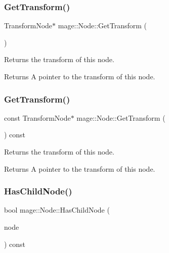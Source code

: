 \subsubsection{\texorpdfstring{Get\+Transform()}{GetTransform()}\hspace{0.1cm}{\footnotesize\ttfamily [1/2]}}
{\footnotesize\ttfamily Transform\+Node$\ast$ mage\+::\+Node\+::\+Get\+Transform (\begin{DoxyParamCaption}{ }\end{DoxyParamCaption})\hspace{0.3cm}{\ttfamily [noexcept]}}

Returns the transform of this node.

\begin{DoxyReturn}{Returns}
A pointer to the transform of this node. 
\end{DoxyReturn}
\hypertarget{classmage_1_1_node_acbffccfec34313d8583546204c3d9fda}{}\label{classmage_1_1_node_acbffccfec34313d8583546204c3d9fda} 
\subsubsection{\texorpdfstring{Get\+Transform()}{GetTransform()}\hspace{0.1cm}{\footnotesize\ttfamily [2/2]}}
{\footnotesize\ttfamily const Transform\+Node$\ast$ mage\+::\+Node\+::\+Get\+Transform (\begin{DoxyParamCaption}{ }\end{DoxyParamCaption}) const\hspace{0.3cm}{\ttfamily [noexcept]}}

Returns the transform of this node.

\begin{DoxyReturn}{Returns}
A pointer to the transform of this node. 
\end{DoxyReturn}
\hypertarget{classmage_1_1_node_a1b8c2d933a281f7f815791db38c965ad}{}\label{classmage_1_1_node_a1b8c2d933a281f7f815791db38c965ad} 
\subsubsection{\texorpdfstring{Has\+Child\+Node()}{HasChildNode()}}
{\footnotesize\ttfamily bool mage\+::\+Node\+::\+Has\+Child\+Node (\begin{DoxyParamCaption}\item[{\hyperlink{namespacemage_a1e01ae66713838a7a67d30e44c67703e}{Shared\+Ptr}$<$ const \hyperlink{classmage_1_1_node}{Node} $>$}]{node }\end{DoxyParamCaption}) const}

